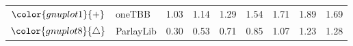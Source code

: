 \begin{tabular}{clrrrrrrr}
\rowcolor{gnuplot1!10}$\color{gnuplot1}{+}$ & oneTBB & \cellcolor{gnuplot1!10} 1.03 & \cellcolor{gnuplot1!10} 1.14 & \cellcolor{gnuplot1!10} 1.29 & \cellcolor{gnuplot1!10} 1.54 & \cellcolor{gnuplot1!10} 1.71 & \cellcolor{gnuplot1!10} 1.89 & \cellcolor{gnuplot1!10} 1.69 \\
\rowcolor{gnuplot8!10}$\color{gnuplot8}{\triangle}$ & ParlayLib & \cellcolor{gnuplot8!10} 0.30 & \cellcolor{gnuplot8!10} 0.53 & \cellcolor{gnuplot8!10} 0.71 & \cellcolor{gnuplot8!10} 0.85 & \cellcolor{gnuplot8!10} 1.07 & \cellcolor{gnuplot8!10} 1.23 & \cellcolor{gnuplot8!10} 1.28 \\
\bottomrule
\end{tabular}
